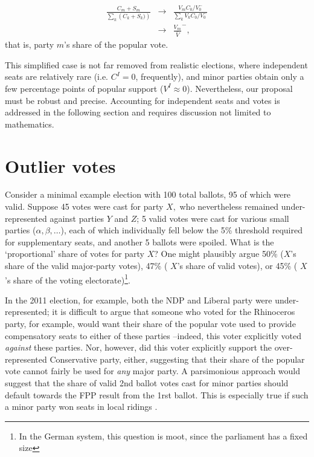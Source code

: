 \documentclass[DIV=calc, paper=a4, fontsize=11pt, twocolumn]{scrartcl}	 %
\begin{document}
\begin{align}
\label{eq:seatshare}
\frac{C_m+S_m}{ \sum\limits_k\left( C_k+S_k) \right)} &\to& \frac{V_m C_0/V_0^-}{ \sum\limits_k V_k C_0/V_0^-} \\
&\to& \frac{V_m}{\bar V}^-,
\end{align}
that is, party $m$'s share of the popular vote. 

This simplified case is not far removed from realistic elections, where independent seats are relatively rare (i.e. $C^I=0$, frequently), and minor parties obtain only a few percentage points of popular support ($V^I \approx 0$). 
Nevertheless, our proposal must be robust and precise. Accounting for independent seats and votes is addressed in the following section and requires discussion not limited to mathematics.

\section{Outlier votes}
\label{sec:outliers}
Consider a minimal example election with 100 total ballots, 95 of which were valid. Suppose 45 votes were cast for party $X,$ who nevertheless remained under-represented against parties $Y$ and $Z$; 5 valid votes were cast for various small parties ($\alpha,\beta,\ldots$), each of which individually fell below the 5\% threshold required for supplementary seats, and another 5 ballots were spoiled. What is the `proportional' share of votes for party $X$?
One might plausibly argue 50\% ($X$'s share of the valid major-party votes), 47\% ( $X$'s share of valid votes), or 45\% ( $X$'s share of the voting electorate)\footnote{ In the German system, this question is moot, since the parliament has a fixed size}.

In the 2011 election, for example, both the NDP and Liberal party were under-represented; it is difficult to argue that someone who voted for the Rhinoceros party, for example, would want their share of the popular vote used to provide compensatory seats to either of these parties --indeed, this voter explicitly voted \emph{against} these parties. Nor, however, did this voter explicitly support the over-represented Conservative party, either, suggesting that their share of the popular vote cannot fairly be used for \emph{any} major party.
A parsimonious approach would suggest that the share of valid 2nd ballot votes cast for minor parties should default towards the FPP result from the 1rst ballot. This is especially true if such a minor party won seats in local ridings . 
\end{document}
